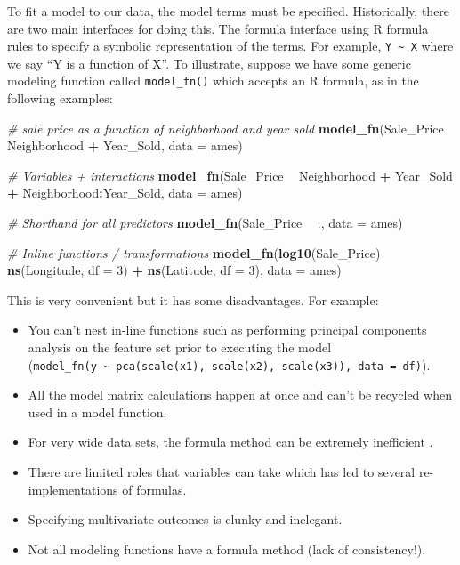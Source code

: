 \documentclass[]{krantz}
\makeatletter
\newenvironment{Shaded}{\begin{snugshade}}{\end{snugshade}}
\newcommand{\CommentTok}[1]{\textcolor[rgb]{0.37,0.37,0.37}{\textit{#1}}}
\newcommand{\DataTypeTok}[1]{\textcolor[rgb]{0.27,0.27,0.27}{#1}}
\newcommand{\DecValTok}[1]{\textcolor[rgb]{0.06,0.06,0.06}{#1}}
\newcommand{\KeywordTok}[1]{\textcolor[rgb]{0.27,0.27,0.27}{\textbf{#1}}}
\newcommand{\NormalTok}[1]{#1}
\newcommand{\OperatorTok}[1]{\textcolor[rgb]{0.43,0.43,0.43}{\textbf{#1}}}
\newcommand{\StringTok}[1]{\textcolor[rgb]{0.5,0.5,0.5}{#1}}
\providecommand{\tightlist}{%
  \setlength{\itemsep}{0pt}\setlength{\parskip}{0pt}}
\newenvironment{kframe}{%
\medskip{}
\setlength{\fboxsep}{.8em}
 \def\at@end@of@kframe{}%
 \ifinner\ifhmode%
  \def\at@end@of@kframe{\end{minipage}}%
  \begin{minipage}{\columnwidth}%
 \fi\fi%
 \def\FrameCommand##1{\hskip\@totalleftmargin \hskip-\fboxsep
 \colorbox{shadecolor}{##1}\hskip-\fboxsep
     \hskip-\linewidth \hskip-\@totalleftmargin \hskip\columnwidth}%
 \MakeFramed {\advance\hsize-\width
   \@totalleftmargin\z@ \linewidth\hsize
   \@setminipage}}%
 {\par\unskip\endMakeFramed%
 \at@end@of@kframe}
\renewenvironment{Shaded}{\begin{kframe}}{\end{kframe}}
\makeatother
\begin{document}
To fit a model to our data, the model terms must be specified. Historically, there are two main interfaces for doing this. The formula interface using R formula rules to specify a symbolic representation of the terms. For example, \texttt{Y\ \textasciitilde{}\ X} where we say ``Y is a function of X''. To illustrate, suppose we have some generic modeling function called \texttt{model\_fn()} which accepts an R formula, as in the following examples:

\begin{Shaded}
\begin{Highlighting}[]
\CommentTok{# sale price as a function of neighborhood and year sold}
\KeywordTok{model_fn}\NormalTok{(Sale_Price }\OperatorTok{~}\StringTok{ }\NormalTok{Neighborhood }\OperatorTok{+}\StringTok{ }\NormalTok{Year_Sold, }\DataTypeTok{data =}\NormalTok{ ames)}

\CommentTok{# Variables + interactions}
\KeywordTok{model_fn}\NormalTok{(Sale_Price }\OperatorTok{~}\StringTok{ }\NormalTok{Neighborhood }\OperatorTok{+}\StringTok{ }\NormalTok{Year_Sold }\OperatorTok{+}\StringTok{ }\NormalTok{Neighborhood}\OperatorTok{:}\NormalTok{Year_Sold, }\DataTypeTok{data =}\NormalTok{ ames)}

\CommentTok{# Shorthand for all predictors}
\KeywordTok{model_fn}\NormalTok{(Sale_Price }\OperatorTok{~}\StringTok{ }\NormalTok{., }\DataTypeTok{data =}\NormalTok{ ames)}

\CommentTok{# Inline functions / transformations}
\KeywordTok{model_fn}\NormalTok{(}\KeywordTok{log10}\NormalTok{(Sale_Price) }\OperatorTok{~}\StringTok{ }\KeywordTok{ns}\NormalTok{(Longitude, }\DataTypeTok{df =} \DecValTok{3}\NormalTok{) }\OperatorTok{+}\StringTok{ }\KeywordTok{ns}\NormalTok{(Latitude, }\DataTypeTok{df =} \DecValTok{3}\NormalTok{), }\DataTypeTok{data =}\NormalTok{ ames)}
\end{Highlighting}
\end{Shaded}

This is very convenient but it has some disadvantages. For example:

\begin{itemize}
\tightlist
\item
  You can't nest in-line functions such as performing principal components analysis on the feature set prior to executing the model (\texttt{model\_fn(y\ \textasciitilde{}\ pca(scale(x1),\ scale(x2),\ scale(x3)),\ data\ =\ df)}).
\item
  All the model matrix calculations happen at once and can't be recycled when used in a model function.
\item
  For very wide data sets, the formula method can be extremely inefficient \citep{kuhnFormula}.
\item
  There are limited roles that variables can take which has led to several re-implementations of formulas.
\item
  Specifying multivariate outcomes is clunky and inelegant.
\item
  Not all modeling functions have a formula method (lack of consistency!).
\end{itemize}
\end{document}
